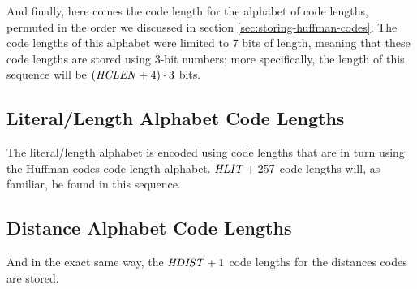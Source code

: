 And finally, here comes the code length for the alphabet of code
lengths, permuted in the order we discussed in section
\ref{sec:storing-huffman-codes}. The code lengths of this alphabet
were limited to 7 bits of length, meaning that these code lengths are
stored using 3-bit numbers; more specifically, the length of this
sequence will be $(\mathit{HCLEN} + 4) \cdot 3$ bits.

\subsection{Literal/Length Alphabet Code Lengths}

The literal/length alphabet is encoded using code lengths that are in
turn using the Huffman codes code length alphabet. $\mathit{HLIT} + 257$
code lengths will, as familiar, be found in this sequence.

\subsection{Distance Alphabet Code Lengths}

And in the exact same way, the $\mathit{HDIST} + 1$ code lengths for the
distances codes are stored.